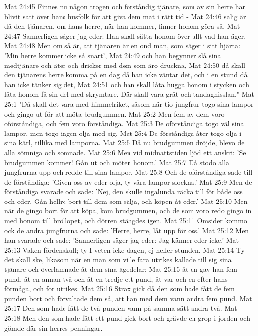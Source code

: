 Mat 24:45  Finnes nu någon trogen och förståndig tjänare, som av sin herre har blivit satt över hans husfolk för att giva dem mat i rätt tid -
Mat 24:46  salig är då den tjänaren, om hans herre, när han kommer, finner honom göra så.
Mat 24:47  Sannerligen säger jag eder: Han skall sätta honom över allt vad han äger.
Mat 24:48  Men om så är, att tjänaren är en ond man, som säger i sitt hjärta: 'Min herre kommer icke så snart',
Mat 24:49  och han begynner slå sina medtjänare och äter och dricker med dem som äro druckna,
Mat 24:50  då skall den tjänarens herre komma på en dag då han icke väntar det, och i en stund då han icke tänker sig det,
Mat 24:51  och han skall låta hugga honom i stycken och låta honom få sin del med skrymtare. Där skall vara gråt och tandagnisslan."
Mat 25:1  "Då skall det vara med himmelriket, såsom när tio jungfrur togo sina lampor och gingo ut för att möta brudgummen.
Mat 25:2  Men fem av dem voro oförståndiga, och fem voro förståndiga.
Mat 25:3  De oförståndiga togo väl sina lampor, men togo ingen olja med sig.
Mat 25:4  De förståndiga åter togo olja i sina kärl, tillika med lamporna.
Mat 25:5  Då nu brudgummen dröjde, blevo de alla sömniga och somnade.
Mat 25:6  Men vid midnattstiden ljöd ett anskri: 'Se brudgummen kommer! Gån ut och möten honom.'
Mat 25:7  Då stodo alla jungfrurna upp och redde till sina lampor.
Mat 25:8  Och de oförståndiga sade till de förståndiga: 'Given oss av eder olja, ty våra lampor slockna.'
Mat 25:9  Men de förståndiga svarade och sade: 'Nej, den skulle ingalunda räcka till för både oss och eder. Gån hellre bort till dem som sälja, och köpen åt eder.'
Mat 25:10  Men när de gingo bort för att köpa, kom brudgummen, och de som voro redo gingo in med honom till bröllopet, och dörren stängdes igen.
Mat 25:11  Omsider kommo ock de andra jungfrurna och sade: 'Herre, herre, låt upp för oss.'
Mat 25:12  Men han svarade och sade: 'Sannerligen säger jag eder: Jag känner eder icke.'
Mat 25:13  Vaken fördenskull; ty I veten icke dagen, ej heller stunden.
Mat 25:14  Ty det skall ske, likasom när en man som ville fara utrikes kallade till sig sina tjänare och överlämnade åt dem sina ägodelar;
Mat 25:15  åt en gav han fem pund, åt en annan två och åt en tredje ett pund, åt var och en efter hans förmåga, och for utrikes.
Mat 25:16  Strax gick då den som hade fått de fem punden bort och förvaltade dem så, att han med dem vann andra fem pund.
Mat 25:17  Den som hade fått de två punden vann på samma sätt andra två.
Mat 25:18  Men den som hade fått ett pund gick bort och grävde en grop i jorden och gömde där sin herres penningar.
